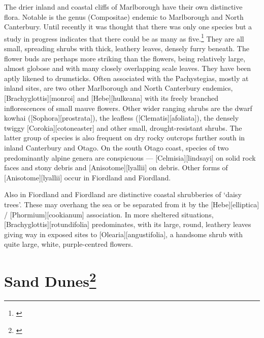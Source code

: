 The drier inland and coastal cliffs of Marlborough have their own distinctive flora.
Notable is the genus  (Compositae) endemic to Marlborough and North Canterbury.
Until recently it was thought that there was only one species but a study in progress indicates that there could be as many as five.\footnote{\cite{molloy1980taxonomy}}
They are all small, spreading shrubs with thick, leathery leaves, densely furry beneath.
The flower buds are perhaps more striking than the flowers, being relatively large, almost globose and with many closely overlapping scale leaves.
They have been aptly likened to drumsticks.
Often associated with the Pachystegias, mostly at inland sites, are two other Marlborough and North Canterbury endemics, [Brachyglottis][monroi] and [Hebe][hulkeana] with its freely branched inflorescences of small mauve flowers.
Other wider ranging shrubs are the dwarf kowhai ([Sophora][prostrata]), the leafless  ([Clematis][afoliata]), the densely twiggy [Corokia][cotoneaster] and other small, drought-resistant shrubs.
The latter group of species is also frequent on dry rocky outcrops further south in inland Canterbury and Otago.
On the south Otago coast, species of two predominantly alpine genera are conspicuous --- [Celmisia][lindsayi] on solid rock faces and stony debris and [Anisotome][lyallii] on debris.
Other forms of [Anisotome][lyallii] occur in Fiordland and Fiordland.

Also in Fiordland and Fiordland are distinctive coastal shrubberies of `daisy trees'.
These may overhang the sea or be separated from it by the [Hebe][elliptica] / [Phormium][cookianum] association.
In more sheltered situations, [Brachyglottis][rotundifolia] predominates, with its large, round, leathery leaves giving way in exposed sites to [Olearia][angustifolia], a handsome shrub with quite large, white, purple-centred flowers.

\section[Sand Dunes]{Sand Dunes\thinspace\footnote{\cite{moore1963plants}}}

